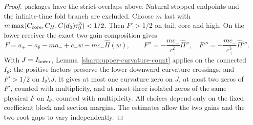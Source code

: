\begin{proof}
packages have the strict overlaps above. Natural stopped endpoints and
the infinite-time fold branch are excluded.
Choose \(m\) last with
\(m\max(C_{\rm core},C_H,C(d_0)\tau_0^3)<1/2\).
Then \(F'>1/2\) on tail, core and high. On the lower receiver the
exact two-gain composition gives
\[
 F=a_+-a_\theta-ma_-+c_+w-mc_-\widehat\Pi(w),\qquad
 F''=-\frac{mc_-}{c_+^2}\widehat\Pi'',\quad
 F'''=-\frac{mc_-}{c_+^3}\widehat\Pi'''.
\]
With \(J=I_{\rm lower}\), Lemma~\ref{sharp:upper-curvature-count}
applies on the connected \(I_\theta\): the positive factors preserve
the lower downward curvature crossings, and \(F'>1/2\) on
\(I_\theta\setminus J\). It gives at most one curvature zero on \(J\),
at most two zeros of \(F'\), counted with multiplicity, and at most
three isolated zeros of the
same physical \(F\) on \(I_\theta\), counted with multiplicity.
All choices depend only on the fixed coefficient block and section
margins. The estimates allow the two gains and the two root gaps to
vary independently.
\end{proof}

